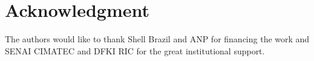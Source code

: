 \documentclass[final,5p,times]{elsarticle}
\begin{document}



\section*{Acknowledgment}
%
The authors would like to thank Shell Brazil and ANP for financing the work and SENAI CIMATEC and DFKI RIC for the great institutional support.

\newpage

\nocite{*}








\end{document}
